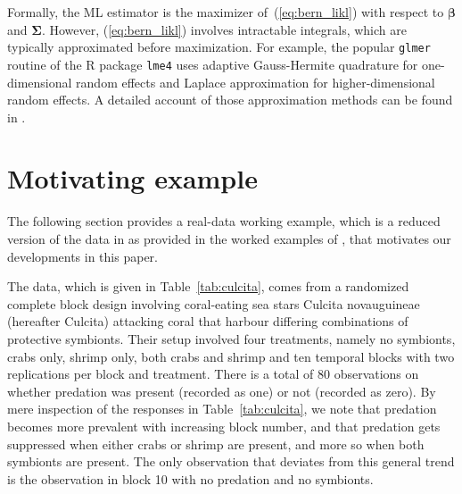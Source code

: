 \documentclass[11pt, a4paper]{article}
\newcommand*{\bb}{\boldsymbol}
\theoremstyle{example} \newtheorem{example}{Example}[section]
\theoremstyle{theorem} \newtheorem{theorem}{Theorem}[section]
\def\bbeta{\bb{\beta}}
\def\bSigma{\bb{\Sigma}}
\begin{document}
Formally, the ML estimator is the maximizer of~(\ref{eq:bern_likl})
with respect to $\bbeta$ and $\bSigma$. However, (\ref{eq:bern_likl})
involves intractable integrals, which are typically approximated
before maximization. For example, the popular \texttt{glmer} routine
of the R package \texttt{lme4} \citep{bates+etal:2015} uses
adaptive Gauss-Hermite quadrature for one-dimensional random effects
and Laplace approximation for higher-dimensional random effects. A
detailed account of those approximation methods can be found in
\citet{pinheiro+bates:1995}.

\section{Motivating example}
\label{sec:culcita_dat}

The following section provides a real-data working example, which is a reduced version of the data in \citet{mckeon+etal:2012} as provided in the worked examples of
\citet{bolker:2015}, that motivates our developments in this paper.

The data, which is given in Table~\ref{tab:culcita},
comes from a randomized complete block design involving coral-eating sea stars Culcita
novauguineae (hereafter Culcita) attacking coral that harbour
differing combinations of protective symbionts. Their setup involved four treatments, namely no symbionts, crabs only, shrimp only, both crabs and shrimp and ten temporal blocks with two replications per block and treatment. There
is a total of 80 observations on whether predation was present
(recorded as one) or not (recorded as zero). By mere inspection of the
responses in Table~\ref{tab:culcita}, we note that predation becomes
more prevalent with increasing block number, and that predation gets
suppressed when either crabs or shrimp are present, and more so when
both symbionts are present. The only observation that deviates from
this general trend is the observation in block 10 with no predation
and no symbionts.
\end{document}
